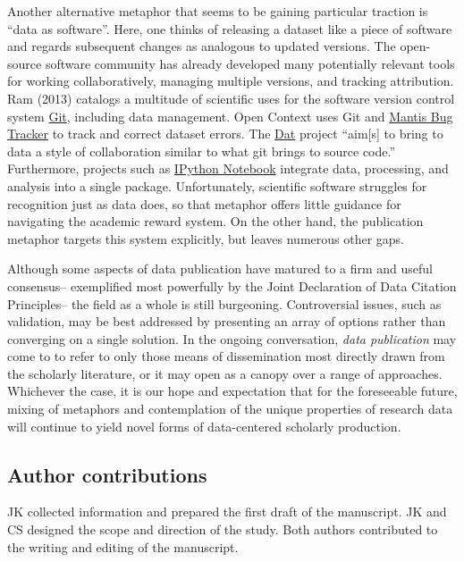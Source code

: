 \documentclass[10pt,a4paper,twocolumn]{article}
\begin{document}
{{Another alternative metaphor that seems to be gaining particular traction is ``data as software''\cite{schopf_treating_2012}.
Here, one thinks of releasing a dataset like a piece of software and regards subsequent changes as analogous to updated versions.
The open-source software community has already developed many potentially relevant tools for working collaboratively, managing multiple versions, and tracking attribution.
Ram (2013)\cite{ram_git_2013} catalogs a multitude of scientific uses for the software version control system \href{http://git-scm.com/}{Git}, including data management.
Open Context uses Git and \href{http://www.mantisbt.org/}{Mantis Bug Tracker} to track and correct dataset errors.
The \href{http://dat-data.com/}{Dat} project ``aim[s] to bring to data a style of collaboration similar to what git brings to source code.''
Furthermore, projects such as \href{http://ipython.org/notebook}{IPython Notebook} integrate data, processing, and analysis into a single package.
Unfortunately, scientific software struggles for recognition\cite{pradal_publishing_2013} just as data does, so that metaphor offers little guidance for navigating the academic reward system.
On the other hand, the publication metaphor targets this system explicitly, but leaves numerous other gaps.

Although some aspects of data publication have matured to a firm and useful consensus-- exemplified most powerfully by the Joint Declaration of Data Citation Principles-- the field as a whole is still burgeoning.
Controversial issues, such as validation, may be best addressed by presenting an array of options rather than converging on a single solution.
In the ongoing conversation, \emph{data publication} may come to to refer to only those means of dissemination most directly drawn from the scholarly literature, or it may open as a canopy over a range of approaches.
Whichever the case, it is our hope and expectation that for the foreseeable future, mixing of metaphors and contemplation of the unique properties of research data will continue to yield novel forms of data-centered scholarly production.


\subsection*{Author contributions}
JK collected information and prepared the first draft of the manuscript.
JK and CS designed the scope and direction of the study.
Both authors contributed to the writing and editing of the manuscript.

}}
\end{document}
